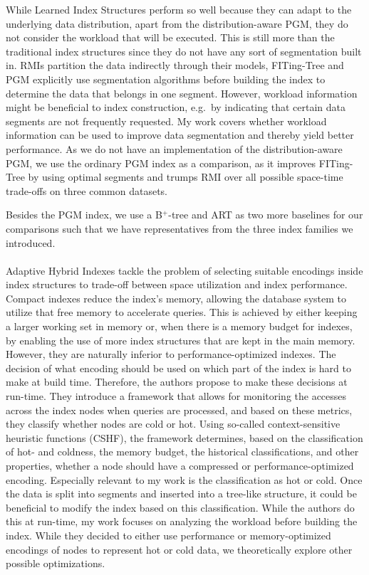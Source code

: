 While Learned Index Structures perform so well because they can adapt to the underlying data distribution, apart from the distribution-aware PGM, they do not consider the workload that will be executed. This is still more than the traditional index structures since they do not have any sort of segmentation built in. RMIs partition the data indirectly through their models, FITing-Tree and PGM explicitly use segmentation algorithms before building the index to determine the data that belongs in one segment. However, workload information might be beneficial to index construction, e.g.~by indicating that certain data segments are not frequently requested. My work covers whether workload information can be used to improve data segmentation and thereby yield better performance. As we do not have an implementation of the distribution-aware PGM, we use the ordinary PGM index as a comparison, as it improves FITing-Tree by using optimal segments and trumps RMI over all possible space-time trade-offs on three common datasets.

\noindent Besides the PGM index, we use a B$^+$-tree and ART as two more baselines for our comparisons such that we have representatives from the three index families we introduced.

\paragraph{}
Adaptive Hybrid Indexes \cite{Anneser2022} tackle the problem of selecting suitable encodings inside index structures to trade-off between space utilization and index performance. Compact indexes reduce the index's memory, allowing the database system to utilize that free memory to accelerate queries. This is achieved by either keeping a larger working set in memory or, when there is a memory budget for indexes, by enabling the use of more index structures that are kept in the main memory. However, they are naturally inferior to performance-optimized indexes. The decision of what encoding should be used on which part of the index is hard to make at build time. Therefore, the authors propose to make these decisions at run-time. They introduce a framework that allows for monitoring the accesses across the index nodes when queries are processed, and based on these metrics, they classify whether nodes are cold or hot. Using so-called context-sensitive heuristic functions (CSHF), the framework determines, based on the classification of hot- and coldness, the memory budget, the historical classifications, and other properties, whether a node should have a compressed or performance-optimized encoding. Especially relevant to my work is the classification as hot or cold. Once the data is split into segments and inserted into a tree-like structure, it could be beneficial to modify the index based on this classification. While the authors do this at run-time, my work focuses on analyzing the workload before building the index. While they decided to either use performance or memory-optimized encodings of nodes to represent hot or cold data, we theoretically explore other possible optimizations.


